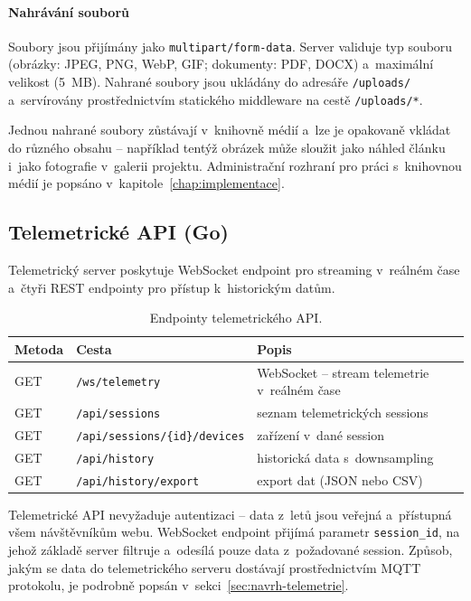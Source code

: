 \paragraph{Nahrávání souborů}
\label{sec:navrh-upload}

Soubory jsou přijímány jako \texttt{multipart/form-data}. Server validuje typ souboru (obrázky: JPEG, PNG, WebP, GIF; dokumenty: PDF, DOCX) a~maximální velikost (5~MB). Nahrané soubory jsou ukládány do adresáře \texttt{/uploads/} a~servírovány prostřednictvím statického middleware na cestě \texttt{/uploads/*}.

Jednou nahrané soubory zůstávají v~knihovně médií a~lze je opakovaně vkládat do různého obsahu -- například tentýž obrázek může sloužit jako náhled článku i~jako fotografie v~galerii projektu. Administrační rozhraní pro práci s~knihovnou médií je popsáno v~kapitole~\ref{chap:implementace}.

\subsection{Telemetrické API (Go)}

Telemetrický server poskytuje WebSocket endpoint pro streaming v~reálném čase a~čtyři REST endpointy pro přístup k~historickým datům.

\begin{table}[ht]
\centering
\small
\begin{tabular}{lll}
\hline
\textbf{Metoda} & \textbf{Cesta} & \textbf{Popis} \\
\hline
GET & \texttt{/ws/telemetry} & WebSocket -- stream telemetrie v~reálném čase \\
GET & \texttt{/api/sessions} & seznam telemetrických sessions \\
GET & \texttt{/api/sessions/\{id\}/devices} & zařízení v~dané session \\
GET & \texttt{/api/history} & historická data s~downsampling \\
GET & \texttt{/api/history/export} & export dat (JSON nebo CSV) \\
\hline
\end{tabular}
\caption{Endpointy telemetrického API.}
\label{tab:telemetry-endpoints}
\end{table}

Telemetrické API nevyžaduje autentizaci -- data z~letů jsou veřejná a~přístupná všem návštěvníkům webu. WebSocket endpoint přijímá parametr \texttt{session\_id}, na jehož základě server filtruje a~odesílá pouze data z~požadované session. Způsob, jakým se data do telemetrického serveru dostávají prostřednictvím MQTT protokolu, je podrobně popsán v~sekci~\ref{sec:navrh-telemetrie}.

